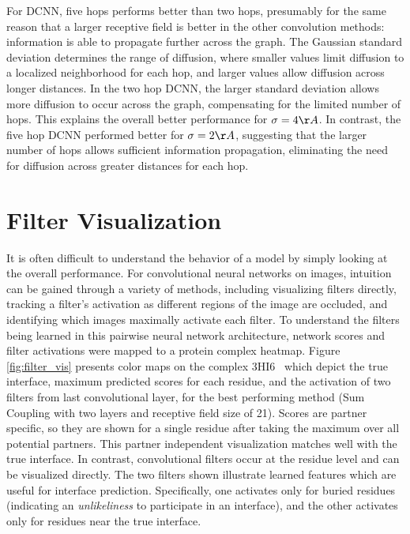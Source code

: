 For DCNN, five hops performs better than two hops, presumably for the same reason that a larger receptive field is better in the other convolution methods: information is able to propagate further across the graph.
The Gaussian standard deviation determines the range of diffusion, where smaller values limit diffusion to a localized neighborhood for each hop, and larger values allow diffusion across longer distances.
In the two hop DCNN, the larger standard deviation allows more diffusion to occur across the graph, compensating for the limited number of hops.
This explains the overall better performance for $\sigma=4\AA{}$.
In contrast, the five hop DCNN performed better for $\sigma=2\AA{}$, suggesting that the larger number of hops allows sufficient information propagation, eliminating the need for diffusion across greater distances for each hop.





\section{Filter Visualization}

It is often difficult to understand the behavior of a model by simply looking at the overall performance. 
For convolutional neural networks on images, intuition can be gained through a variety of methods, including visualizing filters directly, tracking a filter's activation as different regions of the image are occluded, and identifying which images maximally activate each filter. 
To understand the filters being learned in this pairwise neural network architecture, network scores and filter activations were mapped to a protein complex heatmap.
Figure \ref{fig:filter_vis} presents color maps on the complex 3HI6~\cite{zhang2009} which depict the true interface, maximum predicted scores for each residue, and the activation of two filters from last convolutional layer, for the best performing method (Sum Coupling with two layers and receptive field size of 21).
Scores are partner specific, so they are shown for a single residue after taking the maximum over all potential partners.
This partner independent visualization matches well with the true interface.
In contrast, convolutional filters occur at the residue level and can be visualized directly. 
The two filters shown illustrate learned features which are useful for interface prediction.
Specifically, one activates only for buried residues (indicating an \emph{unlikeliness} to participate in an interface), and the other activates only for residues near the true interface.

